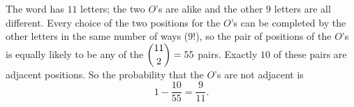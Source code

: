 The word has $11$ letters; the two $O$'s are alike and the other $9$ letters are all different. Every choice of the two positions for the $O$'s can be completed by the other letters in the same number of ways ($9!$), so the pair of positions of the $O$'s is equally likely to be any of the $\dbinom{11}{2}=55$ pairs. Exactly $10$ of these pairs are adjacent positions. So the probability that the $O$'s are not adjacent is
\[1-\dfrac{10}{55}=\boxed{\dfrac{9}{11}}.\]
